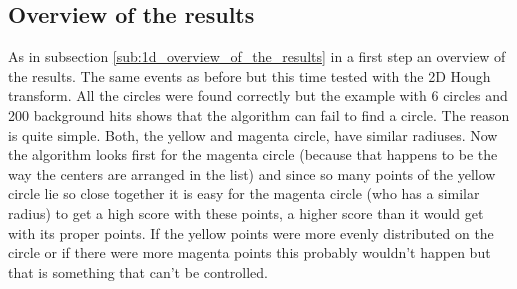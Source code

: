\documentclass[11pt,twoside]{scrreprt}
\begin{document}
\subsection{Overview of the results} %
\label{sub:2d_overview_of_the_results}
As in subsection \ref{sub:1d_overview_of_the_results} in a first step an overview of the results. The same events as before but this time tested with the 2D
Hough transform. All the circles were found correctly but the example with 6 circles and 200 background hits shows that the algorithm can fail to find a 
circle. The reason is quite simple. Both, the yellow and magenta circle, have similar radiuses. Now the algorithm looks first for the magenta circle (because that happens to be the way the centers are arranged in the list) and since so many points of the yellow circle lie so close together it is easy for the magenta circle (who has a similar radius) to get a high score with these points, a higher score than it would get with its proper points. If the yellow points were more evenly distributed on the circle or if there were more magenta points this probably wouldn't happen but that is something that can't be controlled.
\end{document}
